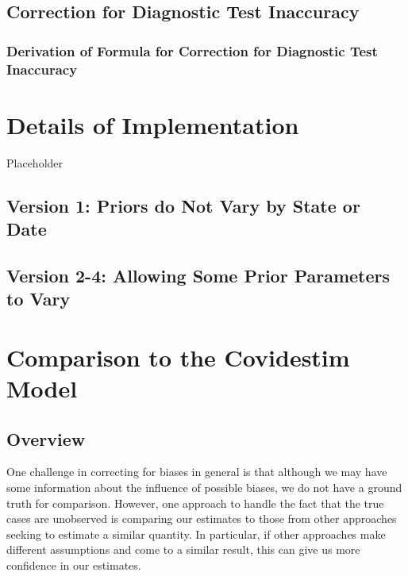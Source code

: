 \documentclass[12pt,twoside]{smiththesis}
\begin{document}
\hypertarget{correct-test-inaccuracy}{%
\section{Correction for Diagnostic Test Inaccuracy}\label{correct-test-inaccuracy}}

\hypertarget{derivation-of-formula-for-correction-for-diagnostic-test-inaccuracy}{%
\subsection{Derivation of Formula for Correction for Diagnostic Test Inaccuracy}\label{derivation-of-formula-for-correction-for-diagnostic-test-inaccuracy}}

\hypertarget{details-of-implementation}{%
\chapter{Details of Implementation}\label{details-of-implementation}}

Placeholder

\hypertarget{version-1-priors-do-not-vary-by-state-or-date}{%
\section{Version 1: Priors do Not Vary by State or Date}\label{version-1-priors-do-not-vary-by-state-or-date}}

\hypertarget{version-2-4-allowing-some-prior-parameters-to-vary}{%
\section{Version 2-4: Allowing Some Prior Parameters to Vary}\label{version-2-4-allowing-some-prior-parameters-to-vary}}

\hypertarget{comparison-to-the-covidestim-model}{%
\chapter{Comparison to the Covidestim Model}\label{comparison-to-the-covidestim-model}}

\hypertarget{overview-2}{%
\section{Overview}\label{overview-2}}

One challenge in correcting for biases in general is that although we may have some information about the influence of possible biases, we do not have a ground truth for comparison. However, one approach to handle the fact that the true cases are unobserved is comparing our estimates to those from other approaches seeking to estimate a similar quantity. In particular, if other approaches make different assumptions and come to a similar result, this can give us more confidence in our estimates.
\end{document}
